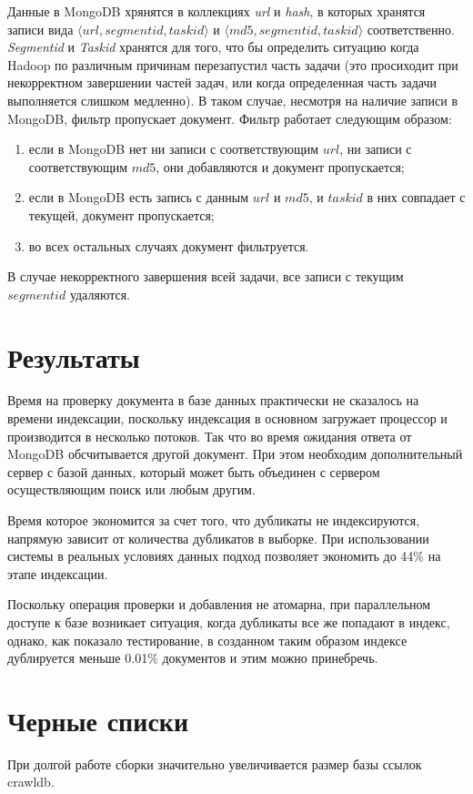 Данные в MongoDB хрянятся в коллекциях \textit{url} и \textit{hash}, в которых хранятся записи вида $\langle url,segmentid,taskid \rangle$ и $\langle md5,segmentid,taskid \rangle$ соответственно.
\textit{Segmentid} и \textit{Taskid} хранятся для того, что бы определить ситуацию когда Hadoop по различным причинам перезапустил часть задачи (это просиходит при некорректном завершении частей задач, или когда определенная часть задачи выполняется слишком медленно). В таком случае, несмотря на наличие записи в MongoDB, фильтр пропускает документ. Фильтр работает следующим образом:
\begin{enumerate}
 \item если в MongoDB нет ни записи с соответствующим $url$, ни записи с соответствующим $md5$, они добавляются и документ пропускается;
 \item если в MongoDB есть запись с данным $url$ и $md5$, и $taskid$ в них совпадает с текущей, документ пропускается;
 \item во всех остальных случаях документ фильтруется.  
\end{enumerate}

В случае некорректного завершения всей задачи, все записи с текущим $segmentid$ удаляются.

\section{Результаты}
Время на проверку документа в базе данных практически не сказалось на времени индексации, поскольку индексация в основном загружает процессор и производится в несколько потоков. Так что во время ожидания ответа от MongoDB обсчитывается другой документ. При этом необходим дополнительный сервер с базой данных, который может быть объединен с сервером осуществляющим поиск или любым другим.

Время которое экономится за счет того, что дубликаты не индексируются, напрямую зависит от количества дубликатов в выборке. При использовании системы в реальных условиях данных подход позволяет экономить до 44\% на этапе индексации.

Поскольку операция проверки и добавления не атомарна, при параллельном доступе к базе возникает ситуация, когда дубликаты все же попадают в индекс, однако, как показало тестирование, в созданном таким образом индексе дублируется меньше 0.01\% документов и этим можно принебречь.

\section{Черные списки}
При долгой работе сборки значительно увеличивается размер базы ссылок crawldb.

